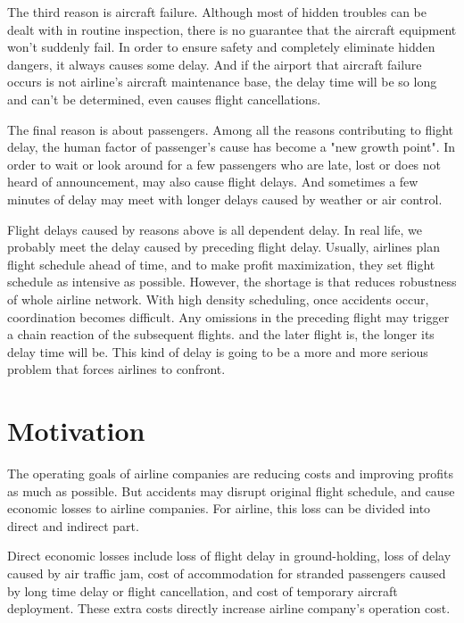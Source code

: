\documentclass[senior]{IPSstyle}
\begin{document}
The third reason is aircraft failure.
Although most of hidden troubles can be dealt with in routine inspection, there is no guarantee that the aircraft equipment won’t suddenly fail. 
In order to ensure safety and completely eliminate hidden dangers, it always causes some delay. 
And if the airport that aircraft failure occurs is not airline’s aircraft maintenance base, the delay time will be so long and can’t be determined, even causes flight cancellations. 

The final reason is about passengers. 
Among all the reasons contributing to flight delay, the human factor of passenger's cause has become a "new growth point".
In order to wait or look around for a few passengers who are late, lost or does not heard of announcement, may also cause flight delays.
And sometimes a few minutes of delay may meet with longer delays caused by weather or air control.

Flight delays caused by reasons above is all dependent delay. In real life, we probably meet the delay caused by preceding flight delay. 
Usually, airlines plan flight schedule ahead of time, and to make profit maximization, they set flight schedule as intensive as possible. 
However, the shortage is that reduces robustness of whole airline network. With high density scheduling, once accidents occur, coordination becomes difficult.
Any omissions in the preceding flight may trigger a chain reaction of the subsequent flights. and the later flight is, the longer its delay time will be.
This kind of delay is going to be a more and more serious problem that forces airlines to confront.



\section{Motivation}
The operating goals of airline companies are reducing costs and improving profits as much as possible.
But accidents may disrupt original flight schedule, and cause economic losses to airline companies.
For airline, this loss can be divided into direct and indirect part.

Direct economic losses include loss of flight delay in ground-holding, loss of delay caused by air traffic jam, cost of accommodation for stranded passengers caused by long time delay or flight cancellation, and cost of temporary aircraft deployment. These extra costs directly increase airline company’s operation cost. 
\end{document}
